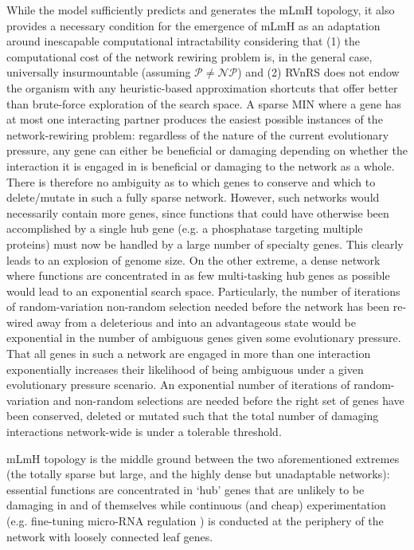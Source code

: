 \documentclass[12pt]{article}
\newcommand{\myC}[1]{{$\mathcal{#1}$}}
\begin{document}
While the model sufficiently predicts and generates the mLmH topology, it also provides a necessary condition for the emergence of mLmH as an adaptation around inescapable computational intractability considering that (1) the computational cost of the network rewiring problem is, in the general case, universally insurmountable (assuming \myC{P}$\neq$\myC{NP}) and (2) RVnRS does not endow the organism with any heuristic-based approximation shortcuts that offer better than brute-force exploration of the search space. A sparse MIN where a gene has at most one interacting partner produces the easiest possible instances of the network-rewiring problem: regardless of the nature of the current evolutionary pressure, any gene can either be beneficial or damaging depending on whether the interaction it is engaged in is beneficial or damaging to the network as a whole. There is therefore no ambiguity as to which genes to conserve and which to delete/mutate in such a fully sparse network. However, such networks would necessarily contain more genes, since  functions that could have otherwise been accomplished by a single hub gene (e.g. a phosphatase targeting multiple proteins) must now be handled by a large number of specialty genes. This clearly leads to an explosion of genome size. On the other extreme, a dense network where functions are concentrated in as few  multi-tasking hub genes as possible would lead to an exponential search space. Particularly, the number of iterations of random-variation non-random selection needed before the network has been re-wired  away from a deleterious and into an advantageous state would be exponential in the number of ambiguous genes given some evolutionary pressure. That all genes in such a network are engaged in more than one interaction exponentially increases their likelihood of being ambiguous under a given evolutionary pressure scenario. An exponential number of iterations of random-variation and non-random selections are needed before the right set of genes have been conserved, deleted or mutated such that the total number of damaging interactions network-wide is under a tolerable threshold.

mLmH topology is the middle ground between the two aforementioned extremes (the totally sparse but large, and the highly dense but unadaptable networks): essential functions are concentrated \cite{gerstein_architecture_2012} in `hub' genes that are unlikely to be damaging in and of themselves \cite{khurana_interpretation_2013}  while continuous (and cheap) experimentation (e.g. fine-tuning micro-RNA regulation \cite{gerstein_architecture_2012}) is conducted at the periphery of the network \cite{kim_positive_2007} with loosely connected leaf genes.
\end{document}
